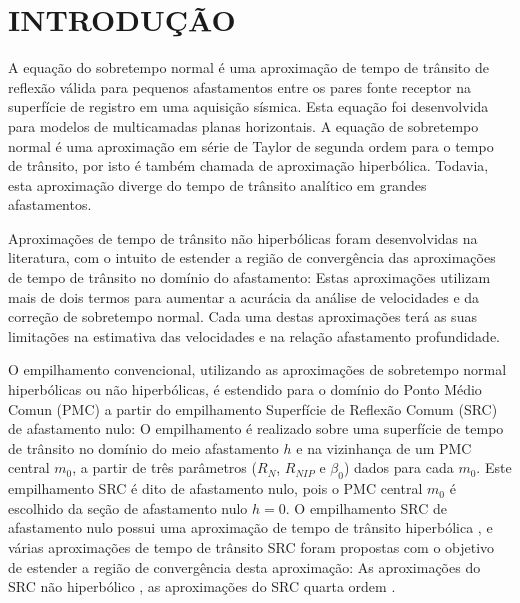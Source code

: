 \chapter{INTRODUÇÃO}
\label{cap1}

A equação do sobretempo normal \cite{dix} é uma aproximação de tempo de trânsito de reflexão válida para pequenos afastamentos
entre os pares fonte receptor na superfície de registro em uma aquisição sísmica. Esta equação foi desenvolvida para modelos de
multicamadas planas horizontais. 
A equação de sobretempo normal é uma aproximação em série de Taylor de segunda ordem para o tempo de trânsito, por isto é
também chamada de aproximação hiperbólica. Todavia, esta aproximação diverge do tempo de trânsito analítico
em grandes afastamentos.

Aproximações de tempo de trânsito não hiperbólicas foram desenvolvidas na literatura,
com o intuito de estender a região de convergência das
aproximações de tempo de trânsito no domínio do afastamento: Estas aproximações utilizam mais de dois termos para aumentar a 
acurácia da análise de velocidades e da correção de sobretempo normal. Cada uma destas aproximações terá
as suas limitações na estimativa das velocidades e na relação afastamento profundidade.

O empilhamento convencional, utilizando as aproximações de sobretempo normal hiperbólicas ou não hiperbólicas, é estendido
para o domínio do Ponto Médio Comun (PMC) a partir do empilhamento Superfície de Reflexão Comum (SRC) de
afastamento nulo: 
O empilhamento é realizado sobre uma superfície de tempo de
trânsito no domínio do meio afastamento $h$ e na vizinhança de um PMC central $m_0$, a partir de
três parâmetros ($R_N$, $R_{NIP}$ e $\beta_0$) dados para cada $m_0$. Este empilhamento SRC é dito de afastamento nulo,
pois o PMC central $m_0$ é escolhido da seção de afastamento nulo $h=0$.
O empilhamento SRC de afastamento nulo possui uma aproximação de tempo de trânsito hiperbólica \cite{jager},
e várias aproximações
de tempo de trânsito SRC foram propostas com o objetivo de estender a região de convergência desta aproximação:
As aproximações do SRC não hiperbólico \cite{fomel1}, as aproximações do SRC quarta ordem
\cite{germam}.

